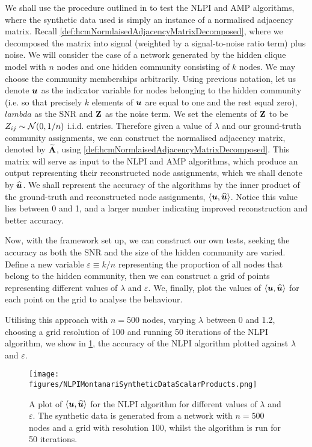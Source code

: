 We shall use the procedure outlined in \cite{Mon13} to test the NLPI and AMP algorithms, where the synthetic data used is simply an instance of a normalised adjacency matrix. Recall \cref{def:hcmNormlaisedAdjacencyMatrixDecomposed}, where we decomposed the matrix into signal (weighted by a signal-to-noise ratio term) plus noise.
We will consider the case of a network generated by the hidden clique model with $n$ nodes and one hidden community consisting of $k$ nodes.
We may choose the community memberships arbitrarily. Using previous notation, let us denote $\vecvar{u}$ as the indicator variable for nodes belonging to the hidden community (i.e. so that precisely $k$ elements of $\vecvar{u}$ are equal to one and the rest equal zero), $lambda$ as the SNR and $\mathbf Z$ as the noise term.
We set the elements of $\mathbf Z$ to be $Z_{ij} \sim \normal{0,1/n}$ i.i.d. entries. Therefore given a value of $\lambda$ and our ground-truth community assignments, we can construct the normalised adjacency matrix, denoted by $\widetilde{\mathbf A}$, using \cref{def:hcmNormlaisedAdjacencyMatrixDecomposed}.
This matrix will serve as input to the NLPI and AMP algorithms, which produce an output representing their reconstructed node assignments, which we shall denote by $\widehat{\vecvar{u}}$.
We shall represent the accuracy of the algorithms by the inner product of the ground-truth and reconstructed node assignments, $\innerP{\vecvar{u},\widehat{\vecvar{u}}}$.
Notice this value lies between 0 and 1, and a larger number indicating improved reconstruction and better accuracy.

Now, with the framework set up, we can construct our own tests, seeking the accuracy as both the SNR and the size of the hidden community are varied.
Define a new variable $\varepsilon \equiv k/n$ representing the proportion of all nodes that belong to the hidden community, then we can construct a grid of points representing different values of $\lambda$ and $\varepsilon$.
We, finally, plot the values of $\innerP{\vecvar{u},\widehat{\vecvar{u}}}$ for each point on the grid to analyse the behaviour.

Utilising this approach with $n=500$ nodes, varying $\lambda$ between 0 and 1.2, choosing a grid resolution of 100 and running 50 iterations of the NLPI algorithm, we show in \cref{fig:NLPIAccuracyPlot}, the accuracy of the NLPI algorithm plotted against $\lambda$ and $\varepsilon$.

\begin{figure}
	\centering
	\texttt{[image: figures/NLPIMontanariSyntheticDataScalarProducts.png]}
	\caption[Plot of accuracy for NLPI algorithm]{\label{fig:NLPIAccuracyPlot} A plot of $\innerP{\vecvar{u},\widehat{\vecvar{u}}}$ for the NLPI algorithm for different values of $\lambda$ and $\varepsilon$. The synthetic data is generated from a network with $n=500$ nodes and a grid with resolution 100, whilst the algorithm is run for 50 iterations.}
\end{figure}

